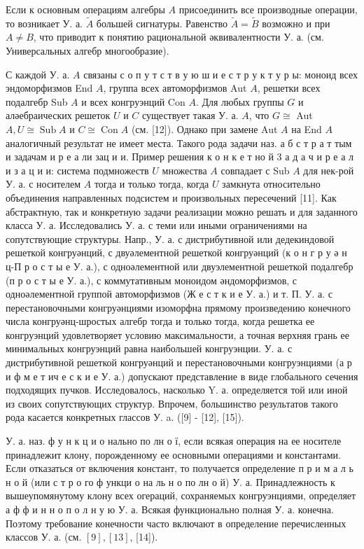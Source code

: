 \documentclass[10pt]{article}
\begin{document}
Если к основным операциям алгебры $A$ присоединить все производные операции, то возникает У. а. $\tilde{A}$ большей сигнатуры. Равенство $\tilde{A}=\tilde{B}$ возможно и при $A \neq B$, что приводит $к$ понятию рациональной әквивалентности У. а. (см. Универсальных алгебр многообразие).



С каждой У. а. $A$ связаны с о п у т с т в у ю ш и е с т р у к т у р ы: моноид всех эндоморфизмов End $A$, группа всех автоморфизмов Aut $A$, решетки всех подалгебр Sub $A$ и всех конгруэнций Con $A$. Для любых группы $G$ и аләебраических решеток $U$ и $C$ существует такая У. а. $A$, что $G \cong$ Aut $A, U \cong \operatorname{Sub} A$ и $C \cong \operatorname{Con} A$ (см. [12]). Однако при замене Aut $A$ на End $A$ аналогичный результат не имеет места. Такого рода задачи наз. а б с т р а т тым и задачам и р е а ли зац и и. Пример решения к о н к е т но й 3 а д а ч и р е а л и з а ц и и: система подмножеств $U$ множества $A$ совпадает с Sub $A$ для нек-рой У. а. с носителем $A$ тогда и только тогда, когда $U$ замкнута относительно объединения направленных подсистем и произвольных пересечений [11]. Как абстрактную, так и конкретную задачи реализации можно решать и для заданного класса У. а. Исследовались У. а. с теми или иными ограничениями на сопутствующие структуры. Напр., У. а. с дистрибутивной или дедекиндовой решеткой конгруәнций, с двуәлементной решеткой конгруәнций (к о н г р у ә н ц-П р о с т ы е У. а.), с одноәлементной или двуэлементной решеткой подалгебр (п р о с т ы е У. а.), с коммутативным моноидом әндоморфизмов, с одноәлементной группой автоморфизмов (Ж е с т к и е У. а.) и т. П. У. а. с перестановочными конгруәнциями изоморфна прямому произведению конечного числа конгруәнц-шростых алгебр тогда и только тогда, когда решетка ее конгруэнций удовлетворяет условию максимальности, а точная верхняя грань ее минимальных конгруэнций равна наибольшей конгруэнции. У. а. с дистрибутивной решеткой конгруәнций и перестановочными конгруэнциями (а р и ф м е т ич е с к и е У. а.) допускают представление в виде глобального сечения подходящих пучков. Исследовалось, насколько $\mathrm{Y}$. а. определяется той или иной из своих сопутствующих структур. Впрочем, большинство результатов такого рода касается конкретных глассов У. a. ([9] - [12], [15]).



У. а. наз. ф у н к ц и о нально по лн о ї, если всякая операция на ее носителе принадлежит клону, порожденному ее основными операциями и константами. Если отказаться от включения констант, то получается определение п р и м а л ь н о й (или с т р о го ф ункци о на ль н о по лн о й) У. а. Принадлежность к вышеупомянутому клону всех огераций, сохраняемых конгруэнциями, определяет а ф ф и н н о п о л н у ю У. а. Всякая функционально полная У. а. конечна. Поэтому требование конечности часто включают в определение перечисленных классов У. а. (см. $[9],[13]$, [14]).
\end{document}
